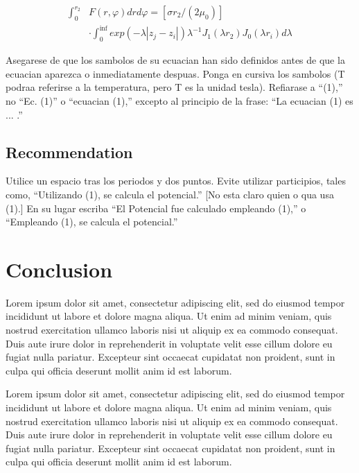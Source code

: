 \documentclass[5p,times,authoryear]{elsarticle}
\begin{document}
\begin{equation} \label{e2}
\begin{array}{ll}
\int_0^{r_2} & F (r, \varphi ) dr d\varphi = [\sigma r_2 / (2 \mu_0 )] \\
& \cdot \int_0^{\inf} exp(-\lambda |z_j - z_i |) \lambda^{-1} J_1 (\lambda  r_2 ) J_0 (\lambda r_i ) d\lambda
\end{array}
\end{equation}

Asegarese de que los sambolos de su ecuacian han sido definidos
antes de que la ecuacian aparezca o inmediatamente despuas. Ponga en
cursiva los sambolos (T podraa referirse a la temperatura, pero T es
la unidad tesla). Refiarase a ``(1),'' no ``Ec. (1)'' o ``ecuacian
(1),'' excepto al principio de la frase: ``La ecuacian (1) es ...
.''

\subsection{Recommendation}

Utilice un espacio tras los periodos y dos puntos. Evite utilizar
participios, tales como, ``Utilizando (1), se calcula el
potencial.'' [No esta claro quien o qua usa (1).] En su lugar
escriba ``El Potencial fue calculado empleando (1),'' o ``Empleando
(1), se calcula el potencial.''

\section{Conclusion}

Lorem ipsum dolor sit amet, consectetur adipiscing elit, sed do eiusmod tempor incididunt ut labore et dolore magna aliqua. Ut enim ad minim veniam, quis nostrud exercitation ullamco laboris nisi ut aliquip ex ea commodo consequat. Duis aute irure dolor in reprehenderit in voluptate velit esse cillum dolore eu fugiat nulla pariatur. Excepteur sint occaecat cupidatat non proident, sunt in culpa qui officia deserunt mollit anim id est laborum.

Lorem ipsum dolor sit amet, consectetur adipiscing elit, sed do eiusmod tempor incididunt ut labore et dolore magna aliqua. Ut enim ad minim veniam, quis nostrud exercitation ullamco laboris nisi ut aliquip ex ea commodo consequat. Duis aute irure dolor in reprehenderit in voluptate velit esse cillum dolore eu fugiat nulla pariatur. Excepteur sint occaecat cupidatat non proident, sunt in culpa qui officia deserunt mollit anim id est laborum.
\end{document}
